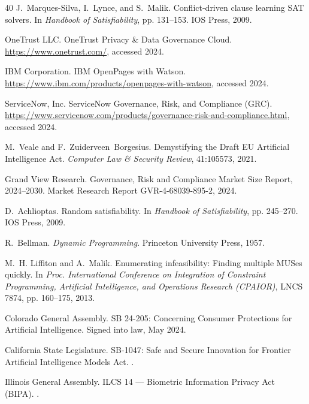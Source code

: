 \documentclass[11pt,twocolumn]{article}
\begin{document}
\begin{thebibliography}{40}
J.~Marques-Silva, I.~Lynce, and S.~Malik.
\newblock Conflict-driven clause learning SAT solvers.
\newblock In \emph{Handbook of Satisfiability}, pp. 131--153. IOS Press, 2009.

OneTrust LLC.
\newblock OneTrust Privacy \& Data Governance Cloud.
\newblock \url{https://www.onetrust.com/}, accessed 2024.

IBM Corporation.
\newblock IBM OpenPages with Watson.
\newblock \url{https://www.ibm.com/products/openpages-with-watson}, accessed 2024.

ServiceNow, Inc.
\newblock ServiceNow Governance, Risk, and Compliance (GRC).
\newblock \url{https://www.servicenow.com/products/governance-risk-and-compliance.html}, accessed 2024.

M.~Veale and F.~Zuiderveen~Borgesius.
\newblock Demystifying the Draft EU Artificial Intelligence Act.
\newblock \emph{Computer Law \& Security Review}, 41:105573, 2021.

Grand View Research.
\newblock Governance, Risk and Compliance Market Size Report, 2024--2030.
\newblock Market Research Report GVR-4-68039-895-2, 2024.

D.~Achlioptas.
\newblock Random satisfiability.
\newblock In \emph{Handbook of Satisfiability}, pp. 245--270. IOS Press, 2009.

R.~Bellman.
\newblock \emph{Dynamic Programming}.
\newblock Princeton University Press, 1957.

M.~H. Liffiton and A.~Malik.
\newblock Enumerating infeasibility: Finding multiple MUSes quickly.
\newblock In \emph{Proc. International Conference on Integration of Constraint
  Programming, Artificial Intelligence, and Operations Research (CPAIOR)},
  LNCS 7874, pp. 160--175, 2013.

Colorado General Assembly.
\newblock SB 24-205: Concerning Consumer Protections for Artificial Intelligence.
\newblock Signed into law, May 2024.

California State Legislature.
\newblock SB-1047: Safe and Secure Innovation for Frontier Artificial
  Intelligence Models Act.
.

Illinois General Assembly.
 ILCS 14 --- Biometric Information Privacy Act (BIPA).
.


\end{thebibliography}
\end{document}
